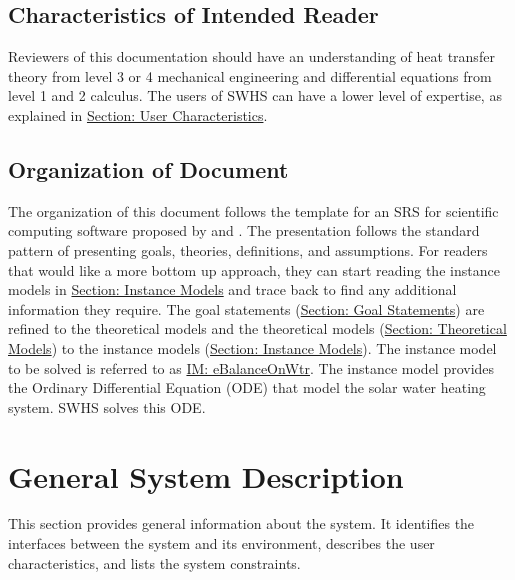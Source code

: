 \documentclass[12pt]{article}
\begin{document}
\subsection{Characteristics of Intended Reader}
\label{Sec:ReaderChars}
Reviewers of this documentation should have an understanding of heat transfer theory from level 3 or 4 mechanical engineering and differential equations from level 1 and 2 calculus. The users of SWHS can have a lower level of expertise, as explained in \hyperref[Sec:UserChars]{Section: User Characteristics}.
\subsection{Organization of Document}
\label{Sec:DocOrg}
The organization of this document follows the template for an SRS for scientific computing software proposed by \cite{dParnas1972} and \cite{parnasClements1984}. The presentation follows the standard pattern of presenting goals, theories, definitions, and assumptions. For readers that would like a more bottom up approach, they can start reading the instance models in \hyperref[Sec:IMs]{Section: Instance Models} and trace back to find any additional information they require.
The goal statements (\hyperref[Sec:GoalStmt]{Section: Goal Statements}) are refined to the theoretical models and the theoretical models (\hyperref[Sec:TMs]{Section: Theoretical Models}) to the instance models (\hyperref[Sec:IMs]{Section: Instance Models}). The instance model to be solved is referred to as \hyperref[IM:eBalanceOnWtr]{IM: eBalanceOnWtr}. The instance model provides the Ordinary Differential Equation (ODE) that model the solar water heating system. SWHS solves this ODE.
\section{General System Description}
\label{Sec:GenSysDesc}
This section provides general information about the system. It identifies the interfaces between the system and its environment, describes the user characteristics, and lists the system constraints.
\end{document}
